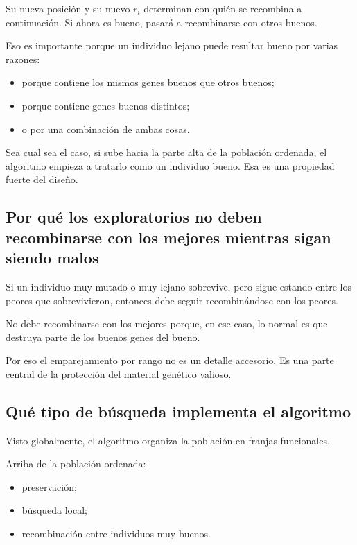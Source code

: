 \documentclass[11pt]{article}
\begin{document}
Su nueva posici\'on y su nuevo \(r_i\) determinan con qui\'en se recombina a
continuaci\'on. Si ahora es bueno, pasar\'a a recombinarse con otros buenos.

Eso es importante porque un individuo lejano puede resultar bueno por varias
razones:

\begin{itemize}
  \item porque contiene los mismos genes buenos que otros buenos;
  \item porque contiene genes buenos distintos;
  \item o por una combinaci\'on de ambas cosas.
\end{itemize}

Sea cual sea el caso, si sube hacia la parte alta de la poblaci\'on ordenada, el
algoritmo empieza a tratarlo como un individuo bueno. Esa es una propiedad
fuerte del dise\~no.

\subsection{Por qu\'e los exploratorios no deben recombinarse con los mejores
mientras sigan siendo malos}

Si un individuo muy mutado o muy lejano sobrevive, pero sigue estando entre los
peores que sobrevivieron, entonces debe seguir recombin\'andose con los peores.

No debe recombinarse con los mejores porque, en ese caso, lo normal es que
destruya parte de los buenos genes del bueno.

Por eso el emparejamiento por rango no es un detalle accesorio. Es una parte
central de la protecci\'on del material gen\'etico valioso.

\subsection{Qu\'e tipo de b\'usqueda implementa el algoritmo}

Visto globalmente, el algoritmo organiza la poblaci\'on en franjas
funcionales.

Arriba de la poblaci\'on ordenada:

\begin{itemize}
  \item preservaci\'on;
  \item b\'usqueda local;
  \item recombinaci\'on entre individuos muy buenos.
\end{itemize}
\end{document}
